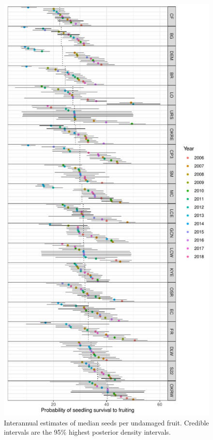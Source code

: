 \documentclass[12pt, oneside]{article}   	%
\begin{document}
 \begin{figure}[!h]
   \centering
       \includegraphics[page=1,height=.95\textheight]{../../figures/interannualSeeds.pdf}  
    \caption{ Interannual estimates of median seeds per undamaged fruit. Credible intervals are the 95\% highest posterior density intervals. }
\end{figure}
\end{document}
